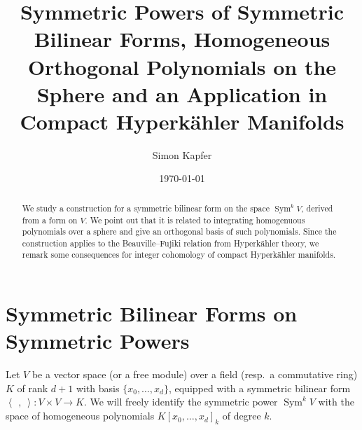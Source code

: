 \documentclass{amsart}
\DeclareMathOperator{\Sym}{Sym}
\theoremstyle{plain}
\theoremstyle{definition}
\theoremstyle{remark}
\begin{document}
\title[Symmetric Powers, Hom.~Orth.~Polynomials, Hyperk\"ahlers]{Symmetric Powers of Symmetric Bilinear Forms, Homogeneous Orthogonal Polynomials on the Sphere and an Application in Compact Hyperk\"ahler Manifolds}


\author{Simon Kapfer}
\address{Simon Kapfer, Laboratoire de Math\'ematiques et Applications, UMR CNRS 6086, Universit\'e de Poitiers, T\'el\'eport 2, Boulevard Marie et Pierre Curie, F-86962 Futuroscope Chasseneuil}


\date{\today}


\begin{abstract} 
We study a construction for a symmetric bilinear form on the space $\Sym^kV$, derived from a form on $V$. We point out that it is related to integrating homogenuous polynomials over a sphere and give an orthogonal basis of such polynomials. Since the construction applies to the Beauville--Fujiki relation from Hyperk\"ahler theory, we remark some consequences for integer cohomology of compact Hyperk\"ahler manifolds.
\end{abstract}

\maketitle


\section{Symmetric Bilinear Forms on Symmetric Powers}
Let $V$ be a vector space (or a free module) over a field (resp.~a commutative ring) $K$ of rank $d+1$ with basis $\{x_0,\ldots,x_{d}\}$, equipped with a symmetric bilinear form $\left<\,\ ,\ \right>: V\times V \rightarrow K$. We will freely identify the symmetric power $\Sym^kV$ with the space of homogeneous polynomials $K[x_0,\ldots,x_d]_k$ of degree $k$. 
\end{document}
